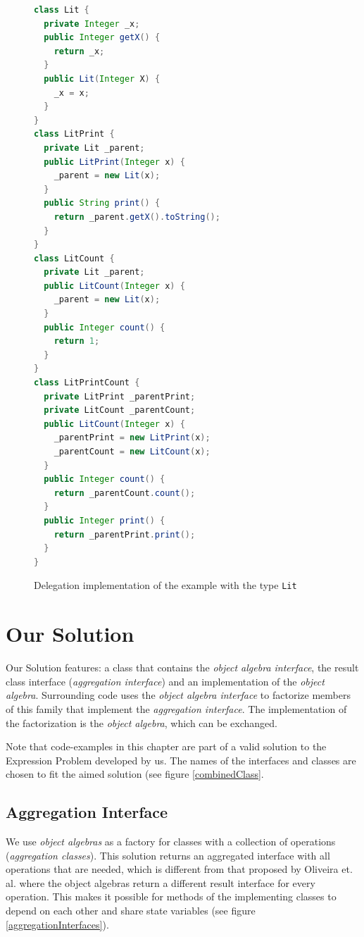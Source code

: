 \documentclass{report}
\begin{document}
\begin{figure}[H]
\begin{lstlisting}[language=java]
class Lit {
  private Integer _x;
  public Integer getX() {
    return _x;
  }
  public Lit(Integer X) {
    _x = x;
  }
}
class LitPrint {
  private Lit _parent;
  public LitPrint(Integer x) {
    _parent = new Lit(x);
  }
  public String print() {
    return _parent.getX().toString();
  }
}
class LitCount {
  private Lit _parent;
  public LitCount(Integer x) {
    _parent = new Lit(x);
  }
  public Integer count() {
    return 1;
  }
}
class LitPrintCount {
  private LitPrint _parentPrint;
  private LitCount _parentCount;
  public LitCount(Integer x) {
    _parentPrint = new LitPrint(x);
    _parentCount = new LitCount(x);
  }
  public Integer count() {
    return _parentCount.count();
  }
  public Integer print() {
    return _parentPrint.print();
  }
}
\end{lstlisting}
\caption{Delegation implementation of the example with the type \lstinline{Lit}}
\label{delegationExample}
\end{figure}


\section{Our Solution}

\label{suggestedEPSolution}

Our Solution features: a class that contains the \emph{object algebra interface}, the result class interface (\emph{aggregation interface}) and an implementation of the \emph{object algebra}. Surrounding code uses the \emph{object algebra interface} to factorize members of this family that implement the \emph{aggregation interface}. The implementation of the factorization is the \emph{object algebra}, which can be exchanged.

Note that code-examples in this chapter are part of a valid solution to the Expression Problem developed by us. The names of the interfaces and classes are chosen to fit the aimed solution (see figure \ref{combinedClass}.

\subsection{Aggregation Interface}

We use \emph{object algebras} as a factory for classes with a collection of operations (\emph{aggregation classes}). This solution returns an aggregated interface with all operations that are needed, which is different from that proposed by Oliveira et. al. where the object algebras return a different result interface for every operation. This makes it possible for methods of the implementing classes to depend on each other and share state variables (see figure \ref{aggregationInterfaces}).
\end{document}
